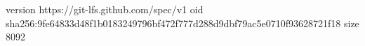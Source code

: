 version https://git-lfs.github.com/spec/v1
oid sha256:9fe64833d48f1b0183249796bf472f777d288d9dbf79ac5e0710f93628721f18
size 8092
